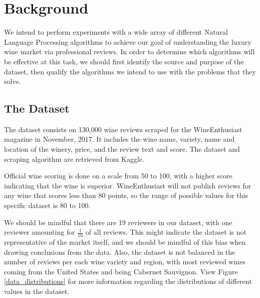 \documentclass[10pt]{IEEEtran}
\begin{document}
\section{Background}
    We intend to perform experiments with a wide array of different Natural Language Processing algorithms to achieve our goal of understanding the luxury wine market via professional reviews. In order to determine which algorithms will be effective at this task, we should first identify the source and purpose of the dataset, then qualify the algorithms we intend to use with the problems that they solve.

\subsection{The Dataset}
    The dataset consists on 130,000 wine reviews scraped for the WineEnthusiast magazine in November, 2017. It includes the wine name, variety, name and location of the winery, price, and the review text and score. The dataset and scraping algorithm are retrieved from Kaggle\cite{data}. \par
    Official wine scoring is done on a scale from 50 to 100, with a higher score indicating that the wine is superior\cite{wine_scoring}. WineEnthusiast will not publish reviews for any wine that scores less than 80 points, so the range of possible values for this specific dataset is 80 to 100. \par
    We should be mindful that there are 19 reviewers in our dataset, with one reviewer amounting for $\frac{1}{10}$ of all reviews. This might indicate the dataset is not representative of the market itself, and we should be mindful of this bias when drawing conclusions from the data.
    Also, the dataset is not balanced in the number of reviews per each wine variety and region, with most reviewed wines coming from the United States and being Cabernet Sauvignon. View Figure \ref{data_distributions} for more information regarding the distributions of different values in the dataset. \par
\end{document}
